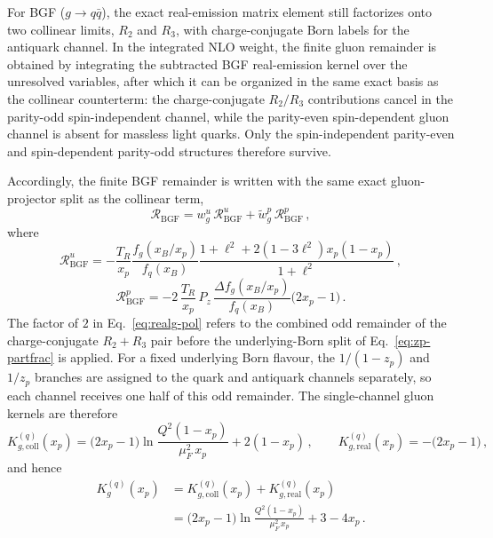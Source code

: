 \documentclass[a4paper,11pt]{article}
\begin{document}
For BGF ($g\to q\bar q$), the exact real-emission matrix element still factorizes onto two collinear limits, $R_2$ and $R_3$, with charge-conjugate Born labels for the antiquark channel.  In the integrated NLO weight, the finite gluon remainder is obtained by integrating the subtracted BGF real-emission kernel over the unresolved variables, after which it can be organized in the same exact basis as the collinear counterterm: the charge-conjugate $R_2/R_3$ contributions cancel in the parity-odd spin-independent channel, while the parity-even spin-dependent gluon channel is absent for massless light quarks.  Only the spin-independent parity-even and spin-dependent parity-odd structures therefore survive.

Accordingly, the finite BGF remainder is written with the same exact gluon-projector split as the collinear term,
\begin{equation}
  \mathcal{R}_{\text{BGF}}
  =
  w_g^{u}\,\mathcal{R}_{\text{BGF}}^{u}
  +
  \widetilde w_g^{p}\,\mathcal{R}_{\text{BGF}}^{p}\,,
  \label{eq:realg-proj}
\end{equation}
where
\begin{equation}
  \mathcal{R}_{\text{BGF}}^{u}
  =
  -\frac{T_R}{x_p}\frac{f_g(x_B/x_p)}{f_q(x_B)}
  \frac{1+\ell^2+2(1-3\ell^2)x_p(1-x_p)}{1+\ell^2}\,,
\end{equation}
\begin{equation}
  \mathcal{R}_{\text{BGF}}^{p}
  =
  -2\,\frac{T_R}{x_p}\,P_z\,\frac{\Delta f_g(x_B/x_p)}{f_q(x_B)}
  \bigl(2x_p-1\bigr)\,.
  \label{eq:realg-pol}
\end{equation}
\noindent
The factor of $2$ in Eq.~\eqref{eq:realg-pol} refers to the combined odd remainder of the charge-conjugate $R_2+R_3$ pair before the underlying-Born split of Eq.~\eqref{eq:zp-partfrac} is applied. For a fixed underlying Born flavour, the $1/(1-z_p)$ and $1/z_p$ branches are assigned to the quark and antiquark channels separately, so each channel receives one half of this odd remainder. The single-channel gluon kernels are therefore
\begin{equation}
  K_{g,\text{coll}}^{(q)}(x_p)
  =
  \bigl(2x_p-1\bigr)\ln\!\frac{Q^2(1-x_p)}{\mu_F^2\,x_p}
  +2(1-x_p)\,,
  \qquad
  K_{g,\text{real}}^{(q)}(x_p)
  =
  -\bigl(2x_p-1\bigr)\,,
\end{equation}
and hence
\begin{align}
  K_{g}^{(q)}(x_p)
  &=
  K_{g,\text{coll}}^{(q)}(x_p)+K_{g,\text{real}}^{(q)}(x_p)
  \nonumber\\
  &=
  \bigl(2x_p-1\bigr)\ln\!\frac{Q^2(1-x_p)}{\mu_F^2\,x_p}
  +3-4x_p\,.
\end{align}
\end{document}
